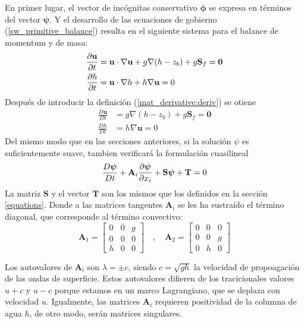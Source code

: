 En primer lugar, el vector de incógnitas conservativo $\bm\phi$ se expresa en términos del vector $\bm\psi$. Y el desarrollo de las ecuaciones de gobierno (\ref{sw_primitive_balance}) resulta en el siguiente sistema para el balance de momentum y de masa:
\begin{subequations}
\begin{align}
    \frac{\partial\mathbf{u}}{\partial t} &= \mathbf{u} \cdot \nabla \mathbf{u} + g \nabla(h-z_b) + g\mathbf{S}_f = \mathbf{0} \\
    \frac{\partial h}{\partial t} &= \mathbf{u} \cdot \nabla h + h \nabla \mathbf{u} = 0
\end{align}
\end{subequations}
Después de introducir la definición (\ref{mat_derivative:deriv}) se otiene
\begin{subequations} \label{pfem_mat_balance}
\begin{align}
    \frac{D\mathbf{u}}{Dt} &= g \nabla(h-z_b) + g\mathbf{S}_f = \mathbf{0} \\
    \frac{Dh}{Dt} &= h \nabla \mathbf{u} = 0
\end{align}
\end{subequations}
Del mismo modo que en las secciones anteriores, si la solución $\psi$ es suficientemente suave, tambien verificará la formulación cuasilineal
\begin{equation}
    \frac{D\bm{\psi}}{Dt} + \mathbf{A}_i\frac{\partial\bm{\psi}}{\partial x_i} + \mathbf{S}\bm{\psi} + \mathbf{T} = 0
\end{equation}
La matriz $\mathbf{S}$ y el vector $\mathbf{T}$ son los mismos que los definidos en la sección \ref{equations}. Donde a las matrices tangentes $\mathbf{A}_i$ se les ha sustraído el término diagonal, que corresponde al término convectivo:
\begin{equation}
    \mathbf{A}_1 = \left[\begin{array}{ccc}
        0 & 0 & g \\
        0 & 0 & 0 \\
        h & 0 & 0
    \end{array}\right] \quad , \quad
    \mathbf{A}_2 = \left[\begin{array}{ccc}
        0 & 0 & 0 \\
        0 & 0 & g \\
        0 & h & 0
    \end{array}\right]
\end{equation}

Los autovalores de $\mathbf{A}_i$ son $\lambda = \pm c$, siendo $c = \sqrt{gh}$ la velocidad de propoagación de las ondas de superficie. Estos autovalores difieren de los tracicionales valores $u+c$ y $u-c$ porque estamos en un marco Lagrangiano, que se deplaza con velocidad $u$. Igualmente, las matrices $\mathbf{A}_i$ requieren positividad de la columna de agua $h$, de otro modo, serán matrices singulares.



